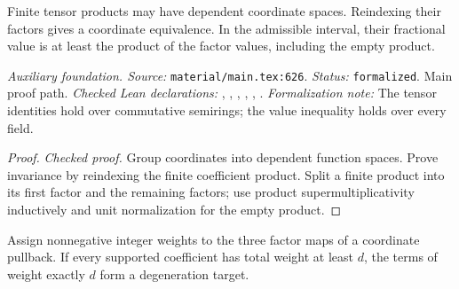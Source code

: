 \renewcommand{\thetheorem}{A64}
\begin{lemma}
\label{aux:finite-tensor-products}
\leanok
Finite tensor products may have dependent coordinate spaces. Reindexing their factors gives a coordinate equivalence. In the admissible interval, their fractional value is at least the product of the factor values, including the empty product.
\end{lemma}

\noindent\textit{Auxiliary foundation. Source:} \texttt{material/main.tex:626}.
\textit{Status:} \texttt{formalized}. Main proof path.
\textit{Checked Lean declarations:} , , , , , .
\textit{Formalization note:} The tensor identities hold over commutative semirings; the value inequality holds over every field.

\begin{proof}
\leanok
{}
\textit{Checked proof.} Group coordinates into dependent function spaces. Prove invariance by reindexing the finite coefficient product. Split a finite product into its first factor and the remaining factors; use product supermultiplicativity inductively and unit normalization for the empty product.
\end{proof}

\renewcommand{\thetheorem}{A65}
\begin{lemma}
\label{aux:monomial-degeneration}
\leanok
Assign nonnegative integer weights to the three factor maps of a coordinate pullback. If every supported coefficient has total weight at least $d$, the terms of weight exactly $d$ form a degeneration target.
\end{lemma}

